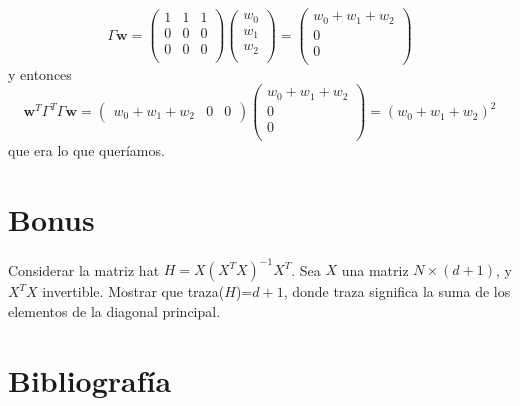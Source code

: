 \documentclass[12pt]{article}
\theoremstyle{definition}
\begin{document}
\begin{pregunta}
\begin{enumerate}
\[\]
\[ \Gamma\mathbf{w} = \left( \begin{array}{ccc}
		1 & 1 & 1 \\
		0 & 0 & 0\\
		0 & 0 & 0 \\ \end{array} \right)
		\left( \begin{array}{c}
		w_0 \\
		w_1 \\
		w_2 \\  \end{array} \right) = \left( \begin{array}{c}
		w_0 + w_1 + w_2 \\
		0 \\
		0 \\  \end{array} \right)
\]
y entonces
\[ \mathbf{w}^T\Gamma^T\Gamma\mathbf{w} = \left( \begin{array}{ccc}
		w_0+w_1+w_2 & 0 & 0 \end{array} \right)
		 \left( \begin{array}{c}
		w_0 + w_1 + w_2 \\
		0 \\
		0 \\  \end{array} \right) = (w_0+w_1+w_2)^2
\]
que era lo que queríamos.
\end{enumerate}
\end{pregunta}

\section{Bonus}
\begin{pregunta}
Considerar la matriz hat $H=X(X^TX)^{-1}X^T$. Sea $X$ una matriz $N \times (d+1)$, y $X^TX$ invertible. Mostrar que traza($H$)=$d+1$, donde traza significa la suma de los elementos de la diagonal principal.

\end{pregunta}

\section{Bibliografía}
\end{document}
